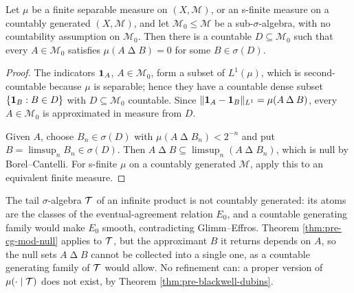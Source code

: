 \begin{theorem}
    \label{thm:pre-cg-mod-null}
    \leanok

    Let $\mu$ be a finite separable measure on $(X, \mathcal{M})$, or an s-finite measure on a
    countably generated $(X, \mathcal{M})$, and let $\mathcal{M}_0 \leq \mathcal{M}$ be a
    sub-$\sigma$-algebra, with no countability assumption on $\mathcal{M}_0$. Then there is a
    countable $D \subseteq \mathcal{M}_0$ such that every $A \in \mathcal{M}_0$ satisfies
    $\mu(A \mathbin{\Delta} B) = 0$ for some $B \in \sigma(D)$.
\end{theorem}
\begin{proof}
    \leanok

    The indicators $\mathbf{1}_A$, $A \in \mathcal{M}_0$, form a subset of $L^1(\mu)$, which is
    second-countable because $\mu$ is separable; hence they have a countable dense subset
    $\left\{ \mathbf{1}_B : B \in D \right\}$ with $D \subseteq \mathcal{M}_0$ countable. Since
    $\lVert \mathbf{1}_A - \mathbf{1}_B\rVert_{L^1} = \mu(A \mathbin{\Delta} B)$, every $A \in \mathcal{M}_0$ is
    approximated in measure from $D$.

    Given $A$, choose $B_n \in \sigma(D)$ with $\mu(A \mathbin{\Delta} B_n) < 2^{-n}$ and put
    $B = \limsup_n B_n \in \sigma(D)$. Then
    $A \mathbin{\Delta} B \subseteq \limsup_n (A \mathbin{\Delta} B_n)$, which is null by
    Borel--Cantelli. For s-finite $\mu$ on a countably generated $\mathcal{M}$, apply this to an
    equivalent finite measure.
\end{proof}

\begin{remark}
    \label{rmk:pre-cg-mod-null-limits}

    The tail $\sigma$-algebra $\mathcal{T}$ of an infinite product is not countably generated: its atoms
    are the classes of the eventual-agreement relation $E_0$, and a countable generating family
    would make $E_0$ smooth, contradicting Glimm--Effros. Theorem \ref{thm:pre-cg-mod-null}
    applies to $\mathcal{T}$, but the approximant $B$ it returns depends on $A$, so the null sets
    $A \mathbin{\Delta} B$ cannot be collected into a single one, as a countable generating family
    of $\mathcal{T}$ would allow. No refinement can: a proper version of $\mu(\cdot \mid \mathcal{T})$ does
    not exist, by Theorem \ref{thm:pre-blackwell-dubins}.
\end{remark}


